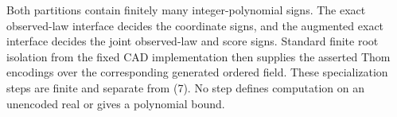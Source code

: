 Both partitions contain finitely many integer-polynomial signs. The exact observed-law interface decides the coordinate signs, and the augmented exact interface decides the joint observed-law and score signs. Standard finite root isolation from the fixed CAD implementation then supplies the asserted Thom encodings over the corresponding generated ordered field. These specialization steps are finite and separate from (7). No step defines computation on an unencoded real or gives a polynomial bound.